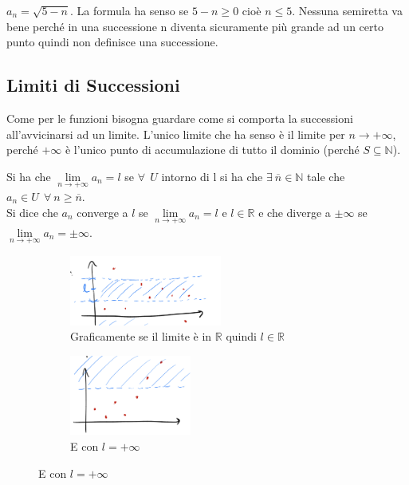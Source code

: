 \begin{example}
$a_n = \sqrt{5 - n}$. La formula ha senso se $5-n \geq 0$ cioè $n \leq 5$. Nessuna semiretta va bene perché in una successione n diventa sicuramente più grande ad un certo punto quindi non definisce una successione.
\end{example}

\subsection{Limiti di Successioni}
Come per le funzioni bisogna guardare come si comporta la successioni all'avvicinarsi ad un limite. L'unico limite che ha senso è il limite per $n\to +\infty$, perché $+\infty$ è l'unico punto di accumulazione di tutto il dominio (perché $S \subseteq \mathbb{N}$).
\begin{definition}
Si ha che $\lim\limits_{n\to +\infty}a_n = l$ se $\forall \:\: U$ intorno di l si ha che $\exists \: \overline{n}\in \mathbb{N}$ tale che $a_n \in U \:\: \forall \: n\geq \overline{n}$.\\
Si dice che $a_n$ converge a $l$ se $\lim\limits_{n\to +\infty}a_n = l$ e $l\in \mathbb{R}$ e che diverge a $\pm \infty$ se $\lim\limits_{n\to +\infty}a_n = \pm \infty$.
\end{definition}

\begin{figure}[h!]
\centering
\begin{subfigure}{.45\textwidth}
    \vspace{-15pt}
    \centering
    \includegraphics[width=5cm]{images/limite-successione-1.png}
    \caption{Graficamente se il limite è in $\mathbb{R}$ quindi $l \in \mathbb{R}$}
\end{subfigure}
\begin{subfigure}{.45\textwidth}
    \centering
    \includegraphics[width=4cm]{images/limite-successione-2.png}
    \caption{E con $l = +\infty$}
\end{subfigure}
\end{figure}

